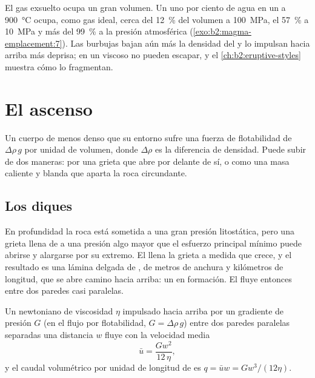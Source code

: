 El gas exsuelto ocupa un gran volumen. Un uno por ciento de agua en un  a
\qty{900}{\celsius} ocupa, como gas ideal, cerca del \qty{12}{\percent} del
volumen a \qty{100}{MPa}, el \qty{57}{\percent} a \qty{10}{MPa} y más del
\qty{99}{\percent} a la presión atmosférica (\cref{exo:b2:magma-emplacement:7}). Las burbujas bajan
aún más la densidad del  y lo impulsan hacia arriba más deprisa; en un  viscoso
no pueden escapar, y el \cref{ch:b2:eruptive-styles} muestra cómo lo fragmentan.

\section{El ascenso}

Un cuerpo de  menos denso que su entorno sufre una fuerza de flotabilidad de
$\Delta\rho\,g$ por unidad de volumen, donde $\Delta\rho$ es la diferencia de densidad.
Puede subir de dos maneras: por una grieta que abre por delante de sí, o como una masa
caliente y blanda que aparta la roca circundante.

\subsection{Los diques}

En profundidad la roca está sometida a una gran presión litostática, pero una grieta llena
de  a una presión algo mayor que el esfuerzo principal mínimo puede
abrirse y alargarse por su extremo. El  llena la grieta a medida que crece, y el resultado
es una lámina delgada de , de metros de anchura y kilómetros de longitud, que se abre camino
hacia arriba: un  en formación. El  fluye entonces entre dos paredes
casi paralelas.

\begin{proposition}\label{prop:b2:magma-emplacement:poiseuille}
Un  newtoniano de viscosidad $\eta$ impulsado hacia arriba por un gradiente de presión $G$
(en el flujo por flotabilidad, $G = \Delta\rho\,g$) entre dos paredes paralelas separadas una distancia $w$
fluye con la velocidad media
\[
\bar u = \frac{G w^2}{12\,\eta},
\]
y el caudal volumétrico por unidad de longitud de  es $q = \bar u w = G w^3/(12\eta)$.
\end{proposition}

